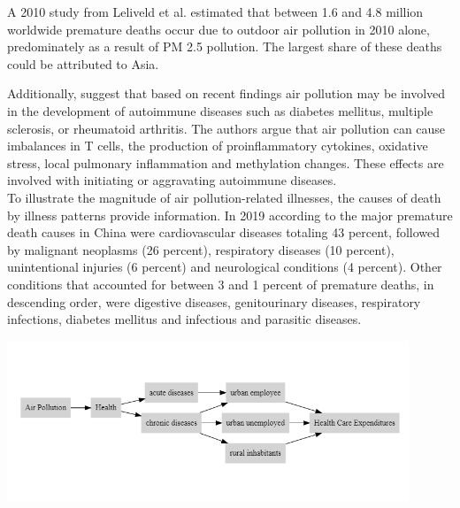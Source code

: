 \documentclass[
]{article}
\begin{document}
	A 2010 study from Leliveld et al. estimated that between 1.6 and 4.8 million worldwide premature deaths occur due to outdoor air pollution in 2010 alone, predominately as a result of PM 2.5 pollution. The largest share of these deaths could be attributed to Asia. 
	
	Additionally, \cite{zhao2019emerging} suggest that based on recent findings air pollution may be involved in the development of autoimmune diseases such as diabetes mellitus, multiple sclerosis, or rheumatoid arthritis. The authors argue that air pollution can cause imbalances in T cells, the production of proinflammatory cytokines, oxidative stress, local pulmonary inflammation and methylation changes. These effects are involved with initiating or aggravating autoimmune diseases. \\ %
	
	To illustrate the magnitude of air pollution-related illnesses, the causes of death by illness patterns provide information. In 2019 according to \cite{who_nodate} the major premature death causes in China were cardiovascular diseases totaling 43 percent, followed by malignant neoplasms (26 percent), respiratory diseases (10 percent), unintentional injuries (6 percent) and neurological conditions (4 percent). Other conditions that accounted for between 3 and 1 percent of premature deaths, in descending order, were digestive diseases, genitourinary diseases, respiratory infections, diabetes mellitus and infectious and parasitic diseases. \\ %
	\begin{center}
		\includegraphics[width=0.9\textwidth]{DAG_true.png} 
		\label{fig:dag}
	\end{center}
\end{document}
